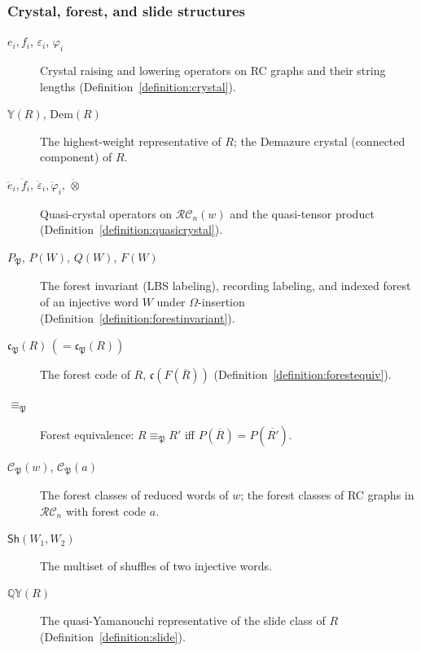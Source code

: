 \documentclass[pdflatex,sn-mathphys-num]{sn-jnl}
\numberwithin{equation}{subsection}
\newcommand{\QY}{\ensuremath{\mathbb{QY}}}
\newcommand{\RC}{\mathcal{RC}}
\newcommand{\code}{\mathfrak{c}}
\newcommand{\forest}{\mathfrak{P}}
\newcommand{\fcode}{\mathfrak{c}_\forest}
\newcommand{\finv}{P_{\forest}}
\theoremstyle{thmstyleone}
\theoremstyle{thmstylethree}
\theoremstyle{thmstyletwo}
\begin{document}
\begin{appendices}
\subsubsection*{Crystal, forest, and slide structures}
\begin{description}
\item[$e_i,f_i$, $\varepsilon_i$, $\varphi_i$] Crystal raising and lowering operators on RC graphs and their string lengths (Definition~\ref{definition:crystal}).
\item[$\mathbb{Y}(R)$, $\mathrm{Dem}(R)$] The highest-weight representative of $R$; the Demazure crystal (connected component) of $R$.
\item[$\ddot e_i,\ddot f_i$, $\ddot\varepsilon_i,\ddot\varphi_i$, $\ddot\otimes$] Quasi-crystal operators on $\RC_n(w)$ and the quasi-tensor product (Definition~\ref{definition:quasicrystal}).
\item[$\finv$, $P(W)$, $Q(W)$, $F(W)$] The forest invariant (LBS labeling), recording labeling, and indexed forest of an injective word $W$ under $\Omega$-insertion (Definition~\ref{definition:forestinvariant}).
\item[$\fcode(R)\,(=\code_\forest(R))$] The forest code of $R$, $\code(F(\overline{R}))$ (Definition~\ref{definition:forestequiv}).
\item[$\equiv_\forest$] Forest equivalence: $R\equiv_\forest R'$ iff $P(\overline{R})=P(\overline{R'})$.
\item[$\mathcal{C}_\forest(w)$, $\mathcal{C}_\forest(a)$] The forest classes of reduced words of $w$; the forest classes of RC graphs in $\RC_n$ with forest code $a$.
\item[$\mathsf{Sh}(W_1,W_2)$] The multiset of shuffles of two injective words.
\item[$\QY(R)$] The quasi-Yamanouchi representative of the slide class of $R$ (Definition~\ref{definition:slide}).
\end{description}


\end{appendices}
\end{document}
